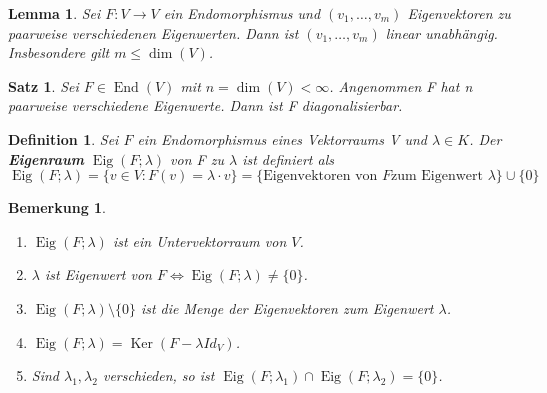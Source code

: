 \documentclass[12pt,a4paper]{article}
\theoremstyle{plain}
\newtheorem{Satz}[Theorem]{Satz}
\newtheorem{Lemma}[Theorem]{Lemma}
\newtheorem{Definition}[Theorem]{Definition}
\newtheorem{Bemerkung}[Theorem]{Bemerkung}
\newcommand{\herv}[1]{{\emph{\textbf{#1}}}}
\numberwithin{equation}{section}
\begin{document}
\begin{Lemma}
Sei $F:V\rightarrow V$ ein Endomorphismus und $(v_1,\ldots,v_m)$ Eigenvektoren zu paarweise verschiedenen Eigenwerten. Dann ist $(v_1,\ldots,v_m)$ linear unabhängig. Insbesondere gilt $m\leq \dim(V)$.
\end{Lemma}
\begin{Satz}
Sei $F\in \operatorname{End}(V)$ mit $n=\dim(V)<\infty$. Angenommen F hat n paarweise verschiedene Eigenwerte. Dann ist F diagonalisierbar.
\end{Satz}
\begin{Definition} Sei $F$ ein Endomorphismus eines Vektorraums V und $\lambda \in K$. Der \herv{Eigenraum} $\operatorname{Eig}(F;\lambda)$ von F zu $\lambda$ ist definiert als \[
\operatorname{Eig}(F;\lambda)=\{v\in V: F(v)=\lambda\cdot v\}=\{\text{Eigenvektoren von }F\text{zum Eigenwert }\lambda\}\cup \{0\}
\]
\end{Definition}
\begin{Bemerkung} \mbox{ }
\begin{enumerate}
\renewcommand{\labelenumi}{\alph{enumi})}
\item $\operatorname{Eig}(F;\lambda)$ ist ein Untervektorraum von $V$.
\item $\lambda$ ist Eigenwert von $F \Leftrightarrow \operatorname{Eig}(F;\lambda)\neq \{0\}$.
\item $\operatorname{Eig}(F;\lambda)\setminus\{0\}$ ist die Menge der Eigenvektoren zum Eigenwert $\lambda$.
\item $\operatorname{Eig}(F;\lambda)=\operatorname{Ker}(F - \lambda Id_V )$.
\item Sind $\lambda_1, \lambda_2$ verschieden, so ist $\operatorname{Eig}(F;\lambda_1)\cap \operatorname{Eig}(F;\lambda_2)=\{0\}$.
\end{enumerate}
\end{Bemerkung}
\end{document}
